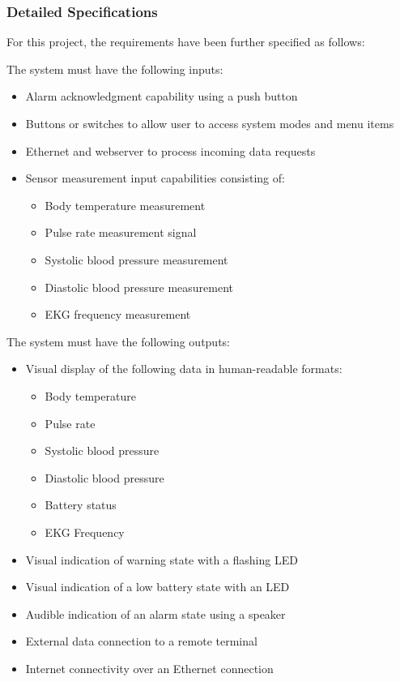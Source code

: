 \documentclass[12pt]{article} %
\begin{document}
\subsubsection{Detailed Specifications }
For this project, the requirements have been further specified as follows:

\begin{itemize}[$$]
	\item The system must have the following inputs:
		\begin{itemize}[$\bullet$]
			\item Alarm acknowledgment capability using a push button
			\item Buttons or switches to allow user to access system modes and menu items
			\item Ethernet and webserver to process incoming data requests
			\item Sensor measurement input capabilities consisting of:
				\begin{itemize}
					\item Body temperature measurement
					\item Pulse rate measurement signal
					\item Systolic blood pressure measurement
					\item Diastolic blood pressure measurement
					\item EKG frequency measurement
				\end{itemize}
    \end{itemize}
\end{itemize}


\begin{itemize}[$$]
  \item The system must have the following outputs:
		\begin{itemize}[$\bullet$]
			\item Visual display of the following data in human-readable formats:
				\begin{itemize}
					\item Body temperature
					\item Pulse rate
					\item Systolic blood pressure
					\item Diastolic blood pressure
					\item Battery status
					\item EKG Frequency
	\end{itemize}
      \item Visual indication of warning state with a flashing LED
      \item Visual indication of a low battery state with an LED
      \item Audible indication of an alarm state using a speaker
      \item External data connection to a remote terminal
			\item Internet connectivity over an Ethernet connection
    \end{itemize}
\end{itemize}
\end{document}
